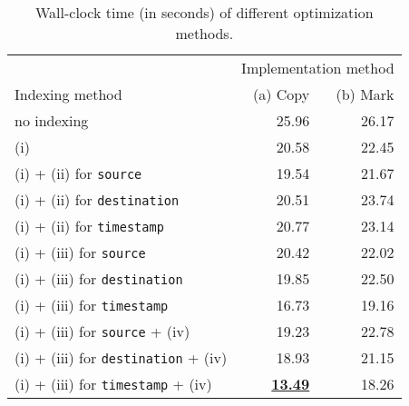 \begin{table}[htbp]
\caption{Wall-clock time (in seconds) of different optimization methods.}
\label{tab:optimization}

\begin{center}
\begin{tabular}{l | r | r }
\hline
 & \multicolumn{2}{c}{Implementation method} \\
Indexing method & (a) Copy & (b) Mark \\
\hline
no indexing & 25.96  & 26.17 \\
\hline
(i) & 20.58 &22.45 \\
\hline
(i) + (ii) for {\tt source} & 19.54 & 21.67   \\
 (i) + (ii) for {\tt destination} & 20.51 & 23.74 \\
 (i) + (ii) for {\tt timestamp} & 20.77 & 23.14  \\

\hline
(i) + (iii) for {\tt source} & 20.42 & 22.02  \\
 (i) + (iii) for {\tt destination} & 19.85 & 22.50 \\
 (i) + (iii) for {\tt timestamp} & 16.73 & 19.16  \\



\hline
(i) + (iii) for {\tt source} + (iv) & 19.23 & 22.78 \\
(i) + (iii) for {\tt destination} + (iv) & 18.93 & 21.15  \\
(i) + (iii) for {\tt timestamp} + (iv) & \underline{\bf 13.49}  & 18.26 \\

\hline 
\end{tabular}

\end{center}
\end{table}%


